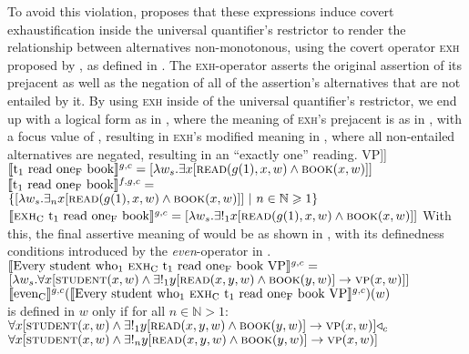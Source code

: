 To avoid this violation, \textcite{Crnic2014-dogma} proposes that these expressions induce covert exhaustification inside the universal quantifier's restrictor to render the relationship between alternatives non-monotonous, using the covert operator {\scshape exh} proposed by \textcite{Chierchia2012}, as defined in .
\ex{}\xe
The {\scshape exh}-operator asserts the original assertion of its prejacent as well as the negation of all of the assertion's alternatives that are not entailed by it. By using {\scshape exh} inside of the universal quantifier's restrictor, we end up with a logical form as in , where the meaning of {\scshape exh}'s prejacent is as in , with a focus value of , resulting in {\scshape exh}'s modified meaning in , where all non-entailed alternatives are negated, resulting in an \enquote{exactly one} reading.
\pex
\a[] [even\textsubscript{C'} [every student wh\textsubscript{1} [{\scshape exh}\textsubscript{C} t\textsubscript{1} read one\textsubscript{F} book] VP]]
\a $\intension[g,c]{t\textsubscript{1} read one\textsubscript{F} book}=[\lambda{w_s}.\exists{x}[\predicate{read}(g(1),x,w)\land\predicate{book}(x,w)]]$
\a $\intension[f,g,c]{t\textsubscript{1} read one\textsubscript{F} book}=$\\\emptyfill$\{[\lambda{w_s}.\exists_n{x}[\predicate{read}(g(1),x,w)\land\predicate{book}(x,w)]]~|~n\in\mathbb{N}\geqslant1\}$
\a $\intension[g,c]{{\scshape exh}\textsubscript{C} t\textsubscript{1} read one\textsubscript{F} book}=[\lambda{w_s}.\exists!_1{x}[\predicate{read}(g(1),x,w)\land\predicate{book}(x,w)]]$
\xe
With this, the final assertive meaning of  would be as shown in , with its definedness conditions introduced by the \textit{even}-operator in .
\ex
$\intension[g,c]{Every student who\textsubscript{1} {\scshape exh}\textsubscript{C} t\textsubscript{1} read one\textsubscript{F} book VP}=$\\\emptyfill$[\lambda{w_s}.\forall{x}[\predicate{student}(x,w)\land\exists!_1{y}[\predicate{read}(x,y,w)\land\predicate{book}(y,w)]\rightarrow\predicate{vp}(x,w)]]$
\xe
\ex
$\intension[g,c]{even\textsubscript{C}}(\intension[g,c]{Every student who\textsubscript{1} {\scshape exh}\textsubscript{C} t\textsubscript{1} read one\textsubscript{F} book VP})(w)$\\is defined in $w$ only if for all $n\in\mathbb{N}>1$:\\$\forall{x}[\predicate{student}(x,w)\land\exists!_1{y}[\predicate{read}(x,y,w)\land\predicate{book}(y,w)]\rightarrow\predicate{vp}(x,w)]\lprob_c$\\\emptyfill$\forall{x}[\predicate{student}(x,w)\land\exists!_n{y}[\predicate{read}(x,y,w)\land\predicate{book}(y,w)]\rightarrow\predicate{vp}(x,w)]$
